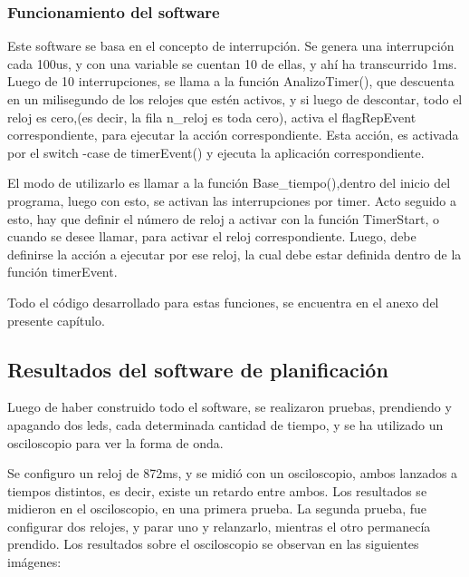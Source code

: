 \subsubsection{Funcionamiento del software} 

Este software se basa en el concepto de interrupción. Se genera una interrupción cada 100us, y con una variable se cuentan 10 de ellas, y ahí ha transcurrido 1ms. Luego de 10 interrupciones, se llama a la función AnalizoTimer(), que descuenta en un milisegundo de los relojes que estén activos, y si luego de descontar, todo el reloj es cero,(es decir, la fila n\_reloj es toda cero), activa el flagRepEvent correspondiente, para ejecutar la acción correspondiente. Esta acción, es activada por el switch -case de timerEvent() y ejecuta la aplicación correspondiente. 

El modo de utilizarlo es llamar a la función Base\_tiempo(),dentro del inicio del programa, luego con esto, se activan las interrupciones por timer. Acto seguido a esto, hay que definir el número de reloj a activar con la función TimerStart, o cuando se desee llamar, para activar el reloj correspondiente. Luego, debe definirse la acción a ejecutar por ese reloj, la cual debe estar definida dentro de la función timerEvent. 

Todo el código desarrollado para estas funciones, se encuentra en el anexo del presente capítulo. 



\subsection{Resultados del software de planificación}

Luego de haber construido todo el software, se realizaron pruebas, prendiendo y apagando dos leds, cada determinada cantidad de tiempo, y se ha utilizado un osciloscopio para ver la forma de onda.
 
Se configuro un reloj de 872ms, y se midió con un osciloscopio, ambos lanzados a tiempos distintos, es decir, existe un retardo entre ambos. Los resultados se midieron en el osciloscopio, en una primera prueba. La segunda prueba, fue configurar dos relojes, y parar uno y relanzarlo, mientras el otro permanecía prendido. Los resultados sobre el osciloscopio se observan en las siguientes imágenes: 


